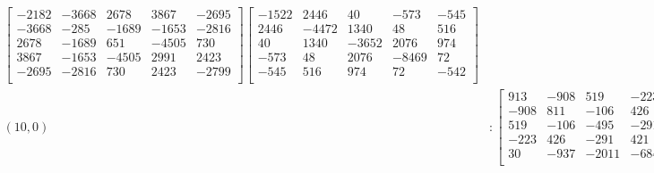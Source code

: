 \documentclass[12pt]{amsart}
\theoremstyle{plain}
\theoremstyle{definition}
\begin{document}
\begin{landscape}
\begin{align*}
\begin{bmatrix}
-2182  &   -3668  &   2678  &   3867  &   -2695  \\ 
 -3668  &   -285  &   -1689  &   -1653  &   -2816  \\ 
 2678  &   -1689  &   651  &   -4505  &   730  \\ 
 3867  &   -1653  &   -4505  &   2991  &   2423  \\ 
 -2695  &   -2816  &   730  &   2423  &   -2799  \\ 
\end{bmatrix}
\begin{bmatrix}
-1522  &   2446  &   40  &   -573  &   -545  \\ 
 2446  &   -4472  &   1340  &   48  &   516  \\ 
 40  &   1340  &   -3652  &   2076  &   974  \\ 
 -573  &   48  &   2076  &   -8469  &   72  \\ 
 -545  &   516  &   974  &   72  &   -542  \\ 
\end{bmatrix}
\\
(10,0) &:
\begin{bmatrix}
913  &   -908  &   519  &   -223  &   30  \\ 
 -908  &   811  &   -106  &   426  &   -937  \\ 
 519  &   -106  &   -495  &   -291  &   -2011  \\ 
 -223  &   426  &   -291  &   421  &   -684  \\ 
 30  &   -937  &   -2011  &   -684  &   -1149  \\ 
\end{bmatrix}
\begin{bmatrix}
926  &   542  &   -257  &   -1320  &   -32  \\ 
 542  &   568  &   624  &   -1797  &   -420  \\ 
 -257  &   624  &   668  &   639  &   -1142  \\ 
 -1320  &   -1797  &   639  &   712  &   -602  \\ 
 -32  &   -420  &   -1142  &   -602  &   -187  \\ 
\end{bmatrix}
\begin{bmatrix}
1940  &   -1206  &   671  &   142  &   -669  \\ 
 -1206  &   235  &   -1443  &   419  &   48  \\ 
 671  &   -1443  &   -1159  &   -976  &   -170  \\ 
 142  &   419  &   -976  &   71  &   141  \\ 

\end{bmatrix}
\end{align*}
\end{landscape}
\end{document}
